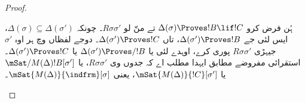 \documentclass[../../../include/open-logic-section]{subfiles}
\begin{document}
\begin{proof}
\begin{enumerate}
{        ہُن فرض کرو $\Delta(\sigma) \Proves !B \lif !C$ تے منّ لو
        $R\sigma\sigma'$۔ چونکہ $\Delta(\sigma) \subseteq \Delta(\sigma')$،
        ایس لئی جے $\Delta(\sigma') \Proves !B$، تاں $\Delta(\sigma') \Proves !C$۔
        دوجے لفظاں وچ ہر اوہ $\sigma'$ جیہڑی $R\sigma\sigma'$ پوری کرے،
        اوہدے لئی یا $\Delta(\sigma') \Proves/ !B$ یا $\Delta(\sigma') \Proves !C$۔
        استقرائی مفروضے مطابق ایہدا مطلب اے کہ جدوں وی $R\sigma\sigma'$،
        یا $\mSat/{M(\Delta)}{!B}[\sigma']$ یا $\mSat{M(\Delta)}{!C}[\sigma']$،
        یعنی $\mSat{M(\Delta)}{\indfrm}[\sigma]$۔}
  \end{enumerate}
\end{proof}
\end{document}
